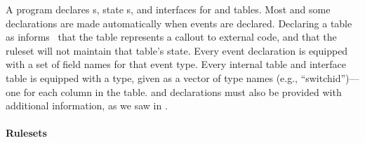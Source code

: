 A program declares s, state s, and interfaces for
 and  tables.  Most  and some  
declarations are made automatically when events are declared. Declaring a table as
 informs \flowlog\ that the table represents a callout
to external code, and that the ruleset will not maintain that table's state. Every
event declaration is equipped with a set of field names for that event type.
Every internal table and interface table is equipped with a type, given as a vector
of type names (e.g., ``switchid'')---one for each column in the table.
 and  declarations must also be provided with
additional information, as we saw in .


\paragraph{Rulesets}

